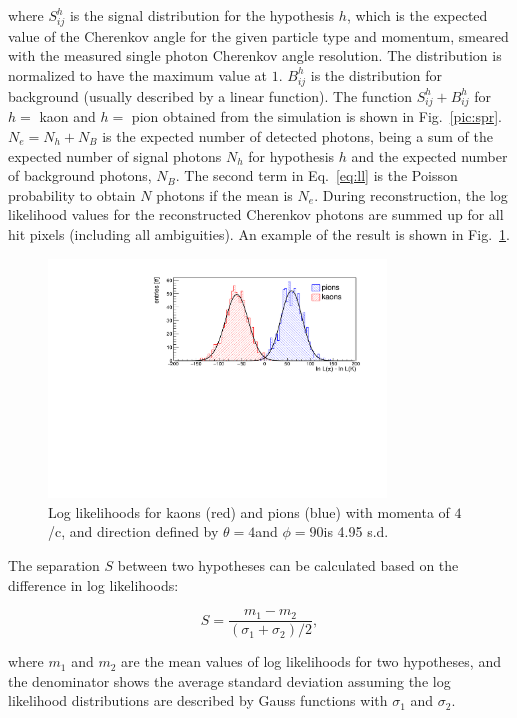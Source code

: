 \noindent where $S^{h}_{ij}$ is the signal distribution for the hypothesis $h$, which is the expected value of the Cherenkov angle for the given particle type and momentum, smeared with the measured single photon Cherenkov angle resolution. The distribution is normalized to have the maximum value at $1$. $B^{h}_{ij}$ is the distribution for background (usually described by a linear function). The function $S^{h}_{ij} + B^{h}_{ij}$ for $h = $ kaon and $h = $ pion obtained from the simulation is shown in Fig.~\ref{pic:spr}. $N_{e} = N_{h} + N_{B}$ is the expected number of detected photons, being a sum of the expected number of signal photons $N_{h}$ for hypothesis $h$ and the expected number of background photons, $N_{B}$. The second term in Eq.~\ref{eq:ll} is the Poisson probability to obtain $N$ photons if the mean is $N_{e}$.
During reconstruction, the log likelihood values for the reconstructed Cherenkov photons are summed up for all hit pixels (including all ambiguities). An example of the result is shown in Fig.~\ref{pic:sepLUT}.

\begin{figure}[!h]
\centering
\includegraphics[clip, trim=0cm 0cm 0cm 0.7cm, width=0.8\textwidth]{pics/hln_rich18.pdf}
\caption{\label{pic:sepLUT}
Log likelihoods for kaons (red) and pions (blue) with momenta of $4$ {\gev}/c, and direction defined by $\theta = 4$\mydeg and $\phi = 90$\mydeg is 4.95 s.d.
}
\end{figure}

The separation $S$ between two hypotheses can be calculated based on the difference in log likelihoods:

\begin{equation}
S = \frac{m_{1}-m_{2}}{(\sigma_{1} + \sigma_{2})/2},
\end{equation}

\noindent where $m_{1}$ and $m_{2}$ are the mean values of log likelihoods for two hypotheses, and the denominator shows the average standard deviation assuming the log likelihood distributions are described by Gauss functions with $\sigma_{1}$ and $\sigma_{2}$.
